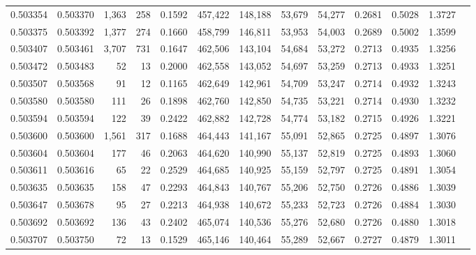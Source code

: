 \begin{tabular}{rrrrrrrrrrrrr}
0.503354 & 0.503370 & 1,363 &   258 &                                     0.1592 & 457,422 & 148,188 &  53,679 &  54,277 & 0.2681 & 0.5028 & 1.3727 \\
0.503375 & 0.503392 & 1,377 &   274 &                                     0.1660 & 458,799 & 146,811 &  53,953 &  54,003 & 0.2689 & 0.5002 & 1.3599 \\
0.503407 & 0.503461 & 3,707 &   731 &                                     0.1647 & 462,506 & 143,104 &  54,684 &  53,272 & 0.2713 & 0.4935 & 1.3256 \\
0.503472 & 0.503483 &    52 &    13 &                                     0.2000 & 462,558 & 143,052 &  54,697 &  53,259 & 0.2713 & 0.4933 & 1.3251 \\
0.503507 & 0.503568 &    91 &    12 &                                     0.1165 & 462,649 & 142,961 &  54,709 &  53,247 & 0.2714 & 0.4932 & 1.3243 \\
0.503580 & 0.503580 &   111 &    26 &                                     0.1898 & 462,760 & 142,850 &  54,735 &  53,221 & 0.2714 & 0.4930 & 1.3232 \\
0.503594 & 0.503594 &   122 &    39 &                                     0.2422 & 462,882 & 142,728 &  54,774 &  53,182 & 0.2715 & 0.4926 & 1.3221 \\
0.503600 & 0.503600 & 1,561 &   317 &                                     0.1688 & 464,443 & 141,167 &  55,091 &  52,865 & 0.2725 & 0.4897 & 1.3076 \\
0.503604 & 0.503604 &   177 &    46 &                                     0.2063 & 464,620 & 140,990 &  55,137 &  52,819 & 0.2725 & 0.4893 & 1.3060 \\
0.503611 & 0.503616 &    65 &    22 &                                     0.2529 & 464,685 & 140,925 &  55,159 &  52,797 & 0.2725 & 0.4891 & 1.3054 \\
0.503635 & 0.503635 &   158 &    47 &                                     0.2293 & 464,843 & 140,767 &  55,206 &  52,750 & 0.2726 & 0.4886 & 1.3039 \\
0.503647 & 0.503678 &    95 &    27 &                                     0.2213 & 464,938 & 140,672 &  55,233 &  52,723 & 0.2726 & 0.4884 & 1.3030 \\
0.503692 & 0.503692 &   136 &    43 &                                     0.2402 & 465,074 & 140,536 &  55,276 &  52,680 & 0.2726 & 0.4880 & 1.3018 \\
0.503707 & 0.503750 &    72 &    13 &                                     0.1529 & 465,146 & 140,464 &  55,289 &  52,667 & 0.2727 & 0.4879 & 1.3011 \\

\end{tabular}
